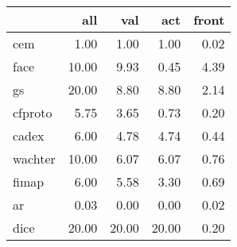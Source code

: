 \begin{tabular}{lrrrr}
\hline
{} &    all &    val &    act &  front \\ \hline
\hline
cem                 &   1.00 &   1.00 &   1.00 &   0.02 \\ \hline
face                &  10.00 &   9.93 &   0.45 &   4.39 \\ \hline
gs     &  20.00 &   8.80 &   8.80 &   2.14 \\ \hline
cfproto             &   5.75 &   3.65 &   0.73 &   0.20 \\ \hline
cadex               &   6.00 &   4.78 &   4.74 &   0.44 \\ \hline
wachter             &  10.00 &   6.07 &   6.07 &   0.76 \\ \hline
fimap               &   6.00 &   5.58 &   3.30 &   0.69 \\ \hline
ar &   0.03 &   0.00 &   0.00 &   0.02 \\ \hline
dice                &  20.00 &  20.00 &  20.00 &   0.20 \\ \hline
\hline
\end{tabular}
